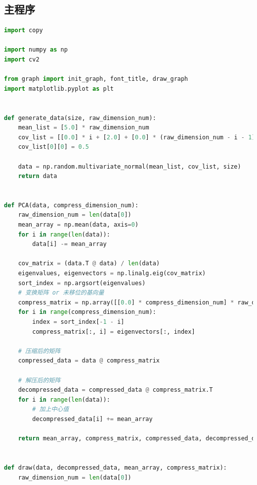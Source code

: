 \documentclass[withoutpreface,bwprint]{cumcmthesis}
\begin{document}
\newpage
\begin{appendix}
\section{主程序}
\begin{lstlisting}[language=python]
import copy

import numpy as np
import cv2

from graph import init_graph, font_title, draw_graph
import matplotlib.pyplot as plt


def generate_data(size, raw_dimension_num):
    mean_list = [5.0] * raw_dimension_num
    cov_list = [[0.0] * i + [2.0] + [0.0] * (raw_dimension_num - i - 1) for i in range(raw_dimension_num)]
    cov_list[0][0] = 0.5

    data = np.random.multivariate_normal(mean_list, cov_list, size)
    return data


def PCA(data, compress_dimension_num):
    raw_dimension_num = len(data[0])
    mean_array = np.mean(data, axis=0)
    for i in range(len(data)):
        data[i] -= mean_array

    cov_matrix = (data.T @ data) / len(data)
    eigenvalues, eigenvectors = np.linalg.eig(cov_matrix)
    sort_index = np.argsort(eigenvalues)
    # 变换矩阵 or 未移位的基向量
    compress_matrix = np.array([[0.0] * compress_dimension_num] * raw_dimension_num)
    for i in range(compress_dimension_num):
        index = sort_index[-1 - i]
        compress_matrix[:, i] = eigenvectors[:, index]

    # 压缩后的矩阵
    compressed_data = data @ compress_matrix

    # 解压后的矩阵
    decompressed_data = compressed_data @ compress_matrix.T
    for i in range(len(data)):
        # 加上中心值
        decompressed_data[i] += mean_array

    return mean_array, compress_matrix, compressed_data, decompressed_data


def draw(data, decompressed_data, mean_array, compress_matrix):
    raw_dimension_num = len(data[0])


\end{lstlisting}
\end{appendix}
\end{document}
